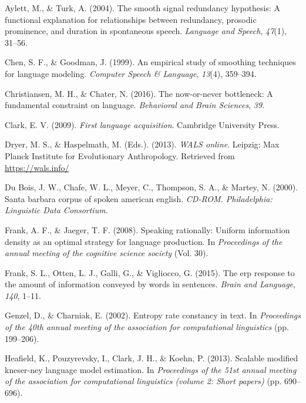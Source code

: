 \documentclass[man,floatsintext]{apa6}
\begin{document}
\leavevmode\hypertarget{ref-aylett2004}{}%
Aylett, M., \& Turk, A. (2004). The smooth signal redundancy hypothesis: A functional explanation for relationships between redundancy, prosodic prominence, and duration in spontaneous speech. \emph{Language and Speech}, \emph{47}(1), 31--56.

\leavevmode\hypertarget{ref-chen1999}{}%
Chen, S. F., \& Goodman, J. (1999). An empirical study of smoothing techniques for language modeling. \emph{Computer Speech \& Language}, \emph{13}(4), 359--394.

\leavevmode\hypertarget{ref-christiansen2016}{}%
Christiansen, M. H., \& Chater, N. (2016). The now-or-never bottleneck: A fundamental constraint on language. \emph{Behavioral and Brain Sciences}, \emph{39}.

\leavevmode\hypertarget{ref-clark2009}{}%
Clark, E. V. (2009). \emph{First language acquisition}. Cambridge University Press.

\leavevmode\hypertarget{ref-wals}{}%
Dryer, M. S., \& Haspelmath, M. (Eds.). (2013). \emph{WALS online}. Leipzig: Max Planck Institute for Evolutionary Anthropology. Retrieved from \url{https://wals.info/}

\leavevmode\hypertarget{ref-sbc}{}%
Du Bois, J. W., Chafe, W. L., Meyer, C., Thompson, S. A., \& Martey, N. (2000). Santa barbara corpus of spoken american english. \emph{CD-ROM. Philadelphia: Linguistic Data Consortium}.

\leavevmode\hypertarget{ref-frank2008}{}%
Frank, A. F., \& Jaeger, T. F. (2008). Speaking rationally: Uniform information density as an optimal strategy for language production. In \emph{Proceedings of the annual meeting of the cognitive science society} (Vol. 30).

\leavevmode\hypertarget{ref-frank2015}{}%
Frank, S. L., Otten, L. J., Galli, G., \& Vigliocco, G. (2015). The erp response to the amount of information conveyed by words in sentences. \emph{Brain and Language}, \emph{140}, 1--11.

\leavevmode\hypertarget{ref-genzel2002}{}%
Genzel, D., \& Charniak, E. (2002). Entropy rate constancy in text. In \emph{Proceedings of the 40th annual meeting of the association for computational linguistics} (pp. 199--206).

\leavevmode\hypertarget{ref-heafield2013}{}%
Heafield, K., Pouzyrevsky, I., Clark, J. H., \& Koehn, P. (2013). Scalable modified kneser-ney language model estimation. In \emph{Proceedings of the 51st annual meeting of the association for computational linguistics (volume 2: Short papers)} (pp. 690--696).
\end{document}
